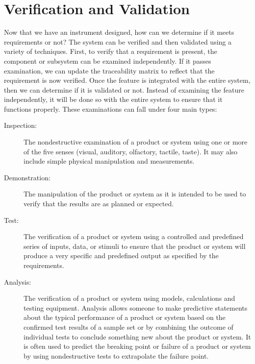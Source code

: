 \chapter{Verification and Validation}
Now that we have an instrument designed, how can we determine if it meets requirements or not?
The system can be verified and then validated using a variety of techniques.
First, to verify that a requirement is present, the component or subsystem can be examined independently.
If it passes examination, we can update the traceability matrix to reflect that the requirement is now verified.
Once the feature is integrated with the entire system, then we can determine if it is validated or not.
Instead of examining the feature independently, it will be done so with the entire system to ensure that it functions properly.
These examinations can fall under four main types:

{
\renewcommand{\descriptionlabel}[1]{\hspace{\labelsep}\textbf{#1}}
\begin{description}
    \item[Inspection:] The nondestructive examination of a product or system using one or more of the five senses (visual, auditory, olfactory, tactile, taste). 
    It may also include simple physical manipulation and measurements.
    
    \item[Demonstration:] The manipulation of the product or system as it is intended to be used to verify that the results are as planned or expected.								
    
    \item[Test:] The verification of a product or system using a controlled and predefined series of inputs, data, or stimuli to ensure that the product or system will produce a very specific and predefined output as specified by the requirements.								
    
    \item[Analysis:] The verification of a product or system using models, calculations and testing equipment.
    Analysis allows someone to make predictive statements about the typical performance of a product or system based on the confirmed test results of a sample set or by combining the outcome of individual tests to conclude something new about the product or system.
    It is often used to predict the breaking point or failure of a product or system by using nondestructive tests to extrapolate the failure point.
\end{description}
}


